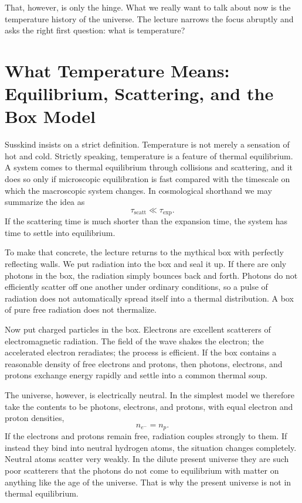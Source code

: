 That, however, is only the hinge. What we really want to talk about now is the temperature history of the universe. The lecture narrows the focus abruptly and asks the right first question: what is temperature?

\section{What Temperature Means: Equilibrium, Scattering, and the Box Model}

Susskind insists on a strict definition. Temperature is not merely a sensation of hot and cold. Strictly speaking, temperature is a feature of thermal equilibrium. A system comes to thermal equilibrium through collisions and scattering, and it does so only if microscopic equilibration is fast compared with the timescale on which the macroscopic system changes. In cosmological shorthand we may summarize the idea as
\begin{equation}
\tau_{\mathrm{scatt}} \ll \tau_{\mathrm{exp}}.
\end{equation}
If the scattering time is much shorter than the expansion time, the system has time to settle into equilibrium.

To make that concrete, the lecture returns to the mythical box with perfectly reflecting walls. We put radiation into the box and seal it up. If there are only photons in the box, the radiation simply bounces back and forth. Photons do not efficiently scatter off one another under ordinary conditions, so a pulse of radiation does not automatically spread itself into a thermal distribution. A box of pure free radiation does not thermalize.

Now put charged particles in the box. Electrons are excellent scatterers of electromagnetic radiation. The field of the wave shakes the electron; the accelerated electron reradiates; the process is efficient. If the box contains a reasonable density of free electrons and protons, then photons, electrons, and protons exchange energy rapidly and settle into a common thermal soup.

The universe, however, is electrically neutral. In the simplest model we therefore take the contents to be photons, electrons, and protons, with equal electron and proton densities,
\begin{equation}
n_{e^-} = n_p.
\end{equation}
If the electrons and protons remain free, radiation couples strongly to them. If instead they bind into neutral hydrogen atoms, the situation changes completely. Neutral atoms scatter very weakly. In the dilute present universe they are such poor scatterers that the photons do not come to equilibrium with matter on anything like the age of the universe. That is why the present universe is not in thermal equilibrium.

